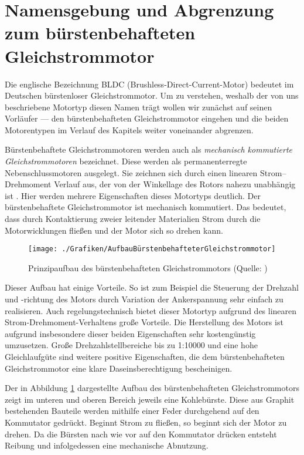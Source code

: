 \section{Namensgebung und Abgrenzung zum bürstenbehafteten Gleichstrommotor}

Die englische Bezeichnung \glqq{}BLDC\grqq{} (Brushless-Direct-Current-Motor) bedeutet im Deutschen \glqq{}bürstenloser Gleichstrommotor\grqq{}. Um zu verstehen, weshalb der von uns beschriebene Motortyp diesen Namen trägt wollen wir zunächst auf seinen Vorläufer --- den bürstenbehafteten Gleichstrommotor eingehen und die beiden Motorentypen im Verlauf des Kapitels weiter voneinander abgrenzen.

Bürstenbehaftete Gleichstrommotoren werden auch als \emph{mechanisch kommutierte Gleichstrommotoren} bezeichnet. Diese \glqq{}werden als permanenterregte Nebenschlussmotoren ausgelegt. Sie zeichnen sich durch einen linearen Strom–Drehmoment Verlauf aus, der von der Winkellage des Rotors nahezu unabhängig ist\grqq{} \parencite[S. 51]{Probst2011}. Hier werden mehrere Eigenschaften dieses Motortyps deutlich. Der bürstenbehaftete Gleichstrommotor ist mechanisch kommutiert. Das bedeutet, dass durch Kontaktierung zweier leitender Materialien Strom durch die Motorwicklungen fließen und der Motor sich so drehen kann.

\begin{figure}[H]
  \centering
  \texttt{[image: ./Grafiken/AufbauBürstenbehafteterGleichstrommotor]}
  \caption[Aufbau bürstenbehafteter Gleichstrommotor]{Prinzipaufbau des bürstenbehafteten Gleichstrommotors (Quelle: \parencite[S. 51]{Probst2011})}
  \label{fig:AufbauBürstenbehaftet}
\end{figure}

Dieser Aufbau hat einige Vorteile. So ist zum Beispiel die Steuerung der Drehzahl und -richtung des Motors durch Variation der Ankerspannung sehr einfach zu realisieren. Auch regelungstechnisch bietet dieser Motortyp aufgrund des linearen Strom-Drehmoment-Verhaltens große Vorteile. Die Herstellung des Motors ist aufgrund insbesondere dieser beiden Eigenschaften sehr kostengünstig umzusetzen. \glqq{}Große Drehzahlstellbereiche bis zu 1:10000 und eine hohe Gleichlaufgüte\grqq{} \parencite[S. 51]{Probst2011} sind weitere positive Eigenschaften, die dem bürstenbehafteten Gleichstrommotor eine klare Daseinsberechtigung bescheinigen.

Der in Abbildung \ref{fig:AufbauBürstenbehaftet} dargestellte Aufbau des bürstenbehafteten Gleichstrommotors zeigt im unteren und oberen Bereich jeweils eine Kohlebürste. Diese aus Graphit bestehenden Bauteile werden mithilfe einer Feder durchgehend auf den Kommutator gedrückt. Beginnt Strom zu fließen, so beginnt sich der Motor zu drehen. Da die Bürsten nach wie vor auf den Kommutator drücken entsteht Reibung und infolgedessen eine mechanische Abnutzung.


